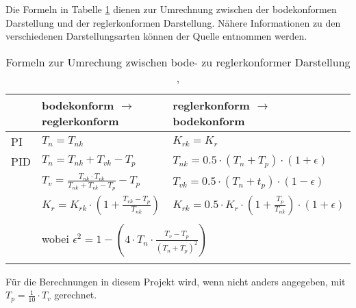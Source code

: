Die    Formeln   in    Tabelle   \ref{tab:bode_regler_konform}    dienen   zur
Umrechnung  zwischen der  bodekonformen  Darstellung  und der  reglerkonformen
Darstellung. N\"ahere  Informationen  zu den  verschiedenen  Darstellungsarten
k\"onnen  der   Quelle  \cite{regelungstechnik:zellweger}   entnommen  werden.

\begin{longtable}{l|ll}
    \toprule


    &
    bodekonform $\rightarrow$ reglerkonform
    &
    reglerkonform $\rightarrow$ bodekonform
    \\

    \midrule

    \endhead
    \endfoot
    \endlastfoot


    PI
    &
    $T_n = T_{nk} $ %
    &
    $K_{rk} = K_r $ %
    \\

    \midrule

    PID
    &
    $T_n = T_{nk}+T_{vk}-T_p$
    &
    $T_{nk}=0.5 \cdot (T_n+T_p) \cdot (1+\epsilon)$
    \\

    &
    $T_v=\frac{T_{nk} \cdot T_{vk}}{T_{nk}+T_{vk}-T_p}-T_p$
    &
    $T_{vk}=0.5 \cdot (T_n+t_p) \cdot (1-\epsilon)$
    \\

    &
    $K_r=K_{rk} \cdot (1 + \frac{T_{vk}-T_p}{T_{nk}})$
    &
    $K_{rk} = 0.5 \cdot K_r \cdot (1 + \frac{T_p}{T_{nk}}) \cdot (1+\epsilon )$
    \\
    \\

    &
    \multicolumn{2}{l}{wobei $\epsilon^2 = 1-(4 \cdot T_n \cdot \frac{T_v-T_p}{(T_n+T_p)^2})$}
    \\
    \bottomrule
    \caption{Formeln zur Umrechung zwischen bode- zu reglerkonformer Darstellung \cite{regelungstechnik:zellweger}, \cite{regelungstechnik:schumleon}}
    \label{tab:bode_regler_konform}
\end{longtable}


F\"ur die Berechnungen in diesem Projekt wird, wenn nicht anders angegeben, mit $T_p=\frac{1}{10} \cdot T_v$ gerechnet.
